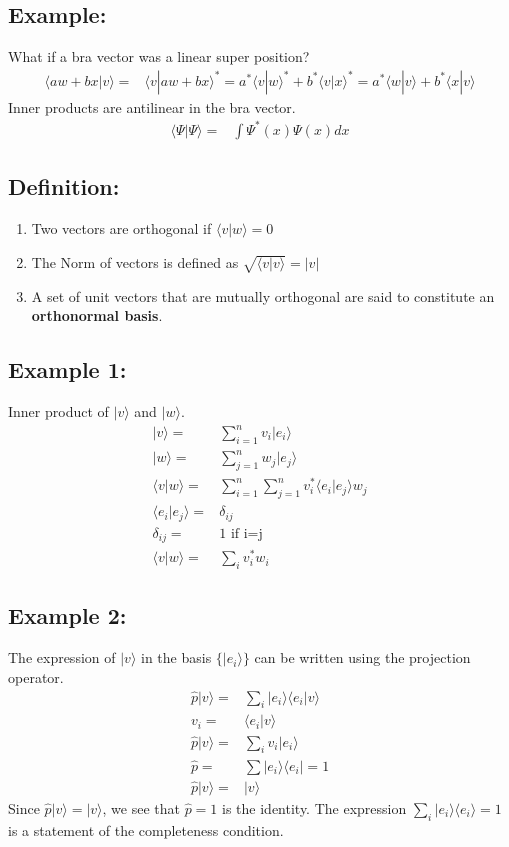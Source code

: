 \documentclass[12pt]{article}
\begin{document}
\subsection*{Example:}
What if a bra vector was a linear super position?
\begin{align*}
\langle aw + bx|v\rangle =& \langle v |aw + bx\rangle^*
= a^*\langle v|w\rangle^* + b^*\langle v|x\rangle^*
= \boxed{a^*\langle w|v\rangle + b^*\langle x|v\rangle}
\end{align*}
Inner products are antilinear in the bra vector.
\begin{align*}
\langle \Psi|\Psi \rangle =& \int \Psi^*(x)\Psi(x) dx
\end{align*}

\subsection*{Definition:}
\begin{enumerate}
\item Two vectors are orthogonal if $\langle v|w \rangle = 0$
\item The Norm of vectors is defined as $\sqrt{\langle v|v \rangle} = |v|$
\item A set of unit vectors that are mutually orthogonal are said to constitute an \textbf{orthonormal basis}.
\end{enumerate}

\subsection*{Example 1:}
Inner product of $|v\rangle$ and $|w\rangle$. 
\begin{align*}
|v\rangle =& \sum_{i=1}^n v_i |e_i\rangle
\\
|w\rangle =& \sum_{j=1}^n w_j |e_j\rangle
\\
\langle v|w \rangle =& \sum_{i=1}^n \sum_{j=1}^n v_i^*\langle e_i|e_j \rangle w_j
\\
\langle e_i|e_j \rangle =& \delta_{ij}
\\
\delta_{ij} =& 1 \text{  if i=j}
\\
\langle v|w \rangle =& \sum_i v_i^*w_i
\end{align*}

\subsection*{Example 2:}
The expression of $|v\rangle$ in the basis $\lbrace |e_i \rangle\rbrace$ can be written using the projection operator.
\begin{align*}
\hat{p} |v\rangle =& \sum_i |e_i\rangle\langle e_i|v\rangle  
\\
v_i =& \langle e_i |v\rangle
\\
\hat{p} |v\rangle =& \sum_i v_i|e_i \rangle 
\\
\hat{p} =& \sum |e_i\rangle\langle e_i| = 1
\\
\hat{p} |v\rangle =& |v\rangle
\end{align*}
Since $\hat{p} |v\rangle = |v\rangle$, we see that $\hat{p} = 1$ is the identity. The expression $\sum_i |e_i\rangle \langle e_i\rangle = 1$ is a statement of the completeness condition. 
\end{document}
